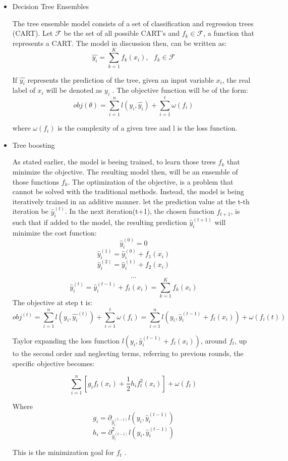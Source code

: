 \begin{itemize}
\item Decision Tree Ensembles
\label{sec:org8a2fddb}

The tree ensemble model consists of a set of classification and regression trees (CART).
Let \(\mathcal{F}\) be the set of all possible CART's and \(f_{k} \in \mathcal{F}\), a function that represents a CART. The model in discussion then, can be written as:
\[
\hat{y_{i}} = \sum_{k=1}^{K} f_{k}(x_{i}),\text{ } f_{k} \in \mathcal{F}
\]

If \(\hat{y_{i}}\) represents the prediction of the tree, given an input variable \(x_{i}\), the real label of \(x_{i}\) will be denoted as \(y_{i}\)  . The objective function will be of the form:
\[
obj(\theta) = \sum_{i=1}^{n} l(y_{i}, \hat{y_{i}}) + \sum_{i=1}^{t}\omega(f_{i})
\]

where \(\omega(f_{i})\) is the complexity of a given tree  and l is the loss function.

\item Tree boosting
\label{sec:orgbee4670}

As stated earlier, the model is beeing trained, to learn those trees \(f_{k}\) that minimize the objective. The resulting model then, will be an ensemble of those functions \(f_{k}\).
The optimization of the objective, is a problem that cannot be solved with the traditional methods. Instead, the model is being iteratively trained in an additive manner.\cite{Chen_2016}
let the prediction value at the t-th iteration be \(\hat{y}^{(t)}_{i}\). In the next iteration(t+1), the chosen function \(f_{t+1}\), is such that if added to the model, the resulting prediction \(\hat{y}^{(t+1)}_{i}\) will minimize the cost function:
\[
\hat{y}^{(0)}_{i} = 0 \]
\[
\hat{y}^{(1)}_{i} =\hat{y}^{(0)}_{i} + f_{1}(x_{i}) 
\]
\[
\hat{y}^{(2)}_{i} =\hat{y}^{(1)}_{i} + f_{2}(x_{i}) 
\]

\[
\dots
\]
\[
\hat{y}_{i}^{(t)} = \hat{y}_{i}^{(t-1)} + f_{t}(x_{i})= \sum_{k=1}^{K} f_{k}(x_{i})
\]
The objective at step t is:
\[
obj^{(t)} = \sum_{i=1}^{n} l(y_{i}, \hat{y_{i}}^{(t)}) + \sum_{i=1}^{t}\omega(f_{i}) = \sum _{i=1}^{n} l(y_{i}, \hat{y}_{i}^{(t-1)} + f_{t}(x_{i})) + \omega(f_{i}(t))
\]

Taylor expanding the loss function \(l(y_{i}, \hat{y}_{i}^{(t-1)} + f_{t}(x_{i}))\), around \(f_{t}\), up to the second order and neglecting terms, referring to previous rounds, the specific objective becomes:

\[
\sum_{i=1}^{n}\left [ g_{i}f_{t}(x_{i})+\frac{1}{2}h_{i}f^{2}_{t} (x_{i}) \right ] + \omega(f_{t})
\]

Where
\[
g_{i} = \partial_{\hat{y}_{i}^{(t-1) }} l(y_{i}, \hat{y}_{i}^{(t-1)} )
\]
\[
h_{i} = \partial^{2}_{\hat{y}_{i}^{(t-1) }} l(y_{i}, \hat{y}_{i}^{(t-1)} )
\]

This is the minimization goal for \(f_{t}\) . \cite{xgboost}
\end{itemize}
